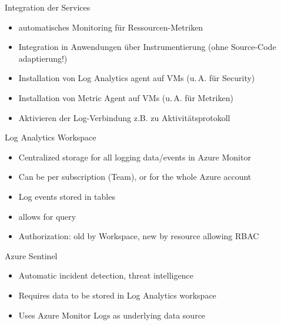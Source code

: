
\begin{flashcard}[Definition]{Integration der Services}
  \begin{itemize}
    \item automatisches Monitoring für Ressourcen-Metriken
    \item Integration in Anwendungen über Instrumentierung\newline
      (ohne Source-Code adaptierung!)
    \item Installation von Log Analytics agent auf VMs (u.\,A. für Security)
    \item Installation von Metric Agent auf VMs (u.\,A. für Metriken)
    \item Aktivieren der Log-Verbindung z.B. zu Aktivitätsprotokoll
  \end{itemize}
\end{flashcard}

\begin{flashcard}[Definition]{Log Analytics Workspace}
  \begin{itemize}
    \item Centralized storage for all logging data/events in Azure Monitor
    \item Can be per subscription (Team), or for the whole Azure account
    \item Log events stored in tables
    \item allows for query
    \item Authorization: old by Workspace, new by resource allowing RBAC
  \end{itemize}
\end{flashcard}

\begin{flashcard}[Definition]{Azure Sentinel}
  \begin{itemize}
    \item Automatic incident detection, threat intelligence
    \item Requires data to be stored in Log Analytics workspace
    \item Uses Azure Monitor Logs as underlying data source
  \end{itemize}
\end{flashcard}


